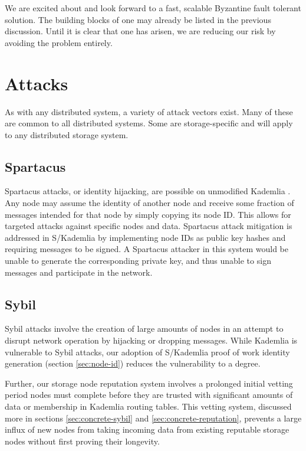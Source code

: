 \documentclass[8pt,fleqn,openany]{book}
\begin{document}
We are excited about and look forward to a fast, scalable Byzantine fault tolerant
solution. The building blocks of one may already be listed in the previous
discussion. Until it is clear that one has arisen, we are reducing our risk
by avoiding the problem entirely.

\chapter{Attacks}

As with any distributed system, a variety of attack vectors exist. Many of these
are common to all distributed systems. Some are storage-specific and will apply
to any distributed storage system.

\section{Spartacus}

Spartacus attacks, or identity hijacking, are possible on unmodified Kademlia
\cite{kad}.
Any node may assume the identity of another node and receive some fraction of
messages intended for that node by simply copying its node ID.
This allows for targeted attacks against specific nodes and data.
Spartacus attack mitigation is addressed in S/Kademlia \cite{skad} by
implementing node IDs as public key hashes and requiring messages to be signed.
A Spartacus attacker in this system would be unable to generate the
corresponding private key, and thus unable to sign messages and participate in
the network.

\section{Sybil}

Sybil attacks \cite{sybil-attack}
involve the creation of large amounts of nodes in an attempt to
disrupt network operation by hijacking or dropping messages. While Kademlia
\cite{kad} is vulnerable to Sybil attacks, our adoption of S/Kademlia
\cite{skad} proof of work identity generation (section \ref{sec:node-id})
reduces the vulnerability to a degree.

Further, our storage node reputation system involves a prolonged initial vetting
period nodes must complete before they are trusted with significant amounts
of data or membership in Kademlia routing tables. This vetting system,
discussed more in sections \ref{sec:concrete-sybil} and
\ref{sec:concrete-reputation}, prevents a large influx of new nodes from taking
incoming data from existing reputable storage nodes without first proving
their longevity.
\end{document}
